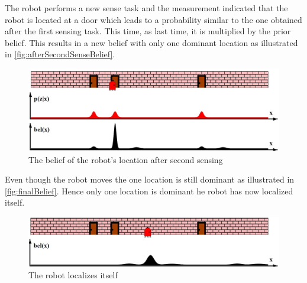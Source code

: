 The robot performs a new sense task and the measurement indicated that the robot is located at a door which leads to a probability similar to the one obtained after the first sensing task. This time, as last time, it is multiplied by the prior belief. This results in a new belief with only one dominant location as illustrated in \autoref{fig:afterSecondSenseBelief}. 

\begin{figure}[H]
\centering
\includegraphics[scale=0.36]{images/MarkovLocalizationD}
\caption{The belief of the robot's location after second sensing}
\label{fig:afterSecondSenseBelief}
\end{figure}

Even though the robot moves the one location is still dominant as illustrated in \autoref{fig:finalBelief}. Hence only one location is dominant he robot has now localized itself.

\begin{figure}[H]
\centering
\includegraphics[scale=0.36]{images/MarkovLocalizationE}
\caption{The robot localizes itself}
\label{fig:finalBelief}
\end{figure}


